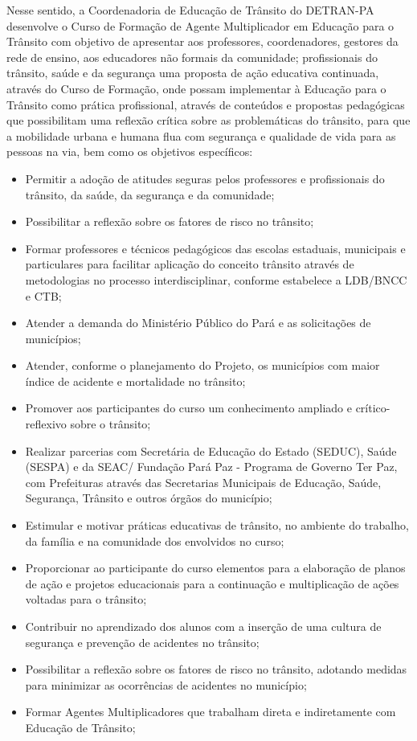 \documentclass[output=paper,colorlinks,citecolor=brown]{langscibook}
\begin{document}
Nesse sentido, a Coordenadoria de Educação de Trânsito do DETRAN-PA desenvolve o Curso de Formação de Agente Multiplicador em Educação para o Trânsito com objetivo de apresentar aos professores, coordenadores, gestores da rede de ensino, aos educadores não formais da comunidade; profissionais do trânsito, saúde e da segurança uma proposta de ação educativa continuada, através do Curso de Formação, onde possam implementar à Educação para o Trânsito como prática profissional, através de conteúdos e propostas pedagógicas que possibilitam uma reflexão crítica sobre as problemáticas do trânsito, para que a mobilidade urbana e humana flua com segurança e qualidade de vida para as pessoas na via, bem como os objetivos específicos: 


\begin{itemize}
    \item Permitir a adoção de atitudes seguras pelos professores e profissionais do trânsito, da saúde, da segurança e da comunidade;
    \item Possibilitar a reflexão sobre os fatores de risco no trânsito; 
    \item Formar professores e técnicos pedagógicos das escolas estaduais, municipais e particulares para facilitar aplicação do conceito trânsito através de metodologias no processo interdisciplinar, conforme estabelece a LDB/BNCC e CTB;
    \item Atender a demanda do Ministério Público do Pará e as solicitações de municípios;
    \item Atender, conforme o planejamento do Projeto, os municípios com maior índice de acidente e mortalidade no trânsito;
    \item Promover aos participantes do curso um conhecimento ampliado e crítico-reflexivo sobre o trânsito;
    \item Realizar parcerias com Secretária de Educação do Estado (SEDUC), Saúde (SESPA) e da SEAC/ Fundação Pará Paz - Programa de Governo Ter Paz, com Prefeituras através das Secretarias Municipais de Educação, Saúde, Segurança, Trânsito e outros órgãos do município;
    \item Estimular e motivar práticas educativas de trânsito, no ambiente do trabalho, da família e na comunidade dos envolvidos no curso;
    \item Proporcionar ao participante do curso elementos para a elaboração de planos de ação e projetos educacionais para a continuação e multiplicação de ações voltadas para o trânsito;
    \item Contribuir no aprendizado dos alunos com a inserção de uma cultura de segurança e prevenção de acidentes no trânsito;	
    \item Possibilitar a reflexão sobre os fatores de risco no trânsito, adotando medidas para minimizar as ocorrências de acidentes no município;
    \item Formar Agentes Multiplicadores que trabalham direta e indiretamente com Educação de Trânsito;
\end{itemize}
\end{document}
